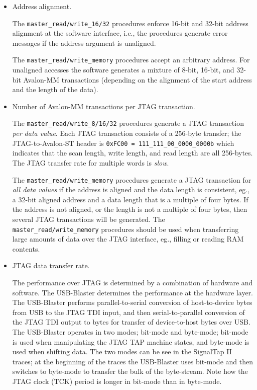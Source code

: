 \documentclass[10pt,twoside]{article}
\begin{document}
\begin{itemize}
\item Address alignment.

The \verb+master_read/write_16/32+ procedures enforce 16-bit and
32-bit address alignment at the software interface, i.e., the 
procedures generate error messages if the address argument is
unaligned.

The \verb+master_read/write_memory+ procedures accept an arbitrary
address. For unaligned accesses the software generates a mixture
of 8-bit, 16-bit, and 32-bit Avalon-MM transactions (depending on
the alignment of the start address and the length of the data).

\item Number of Avalon-MM transactions per JTAG transaction.

The \verb+master_read/write_8/16/32+ procedures generate a
JTAG transaction {\em per data value}. Each JTAG
transaction consists of a 256-byte transfer;
the JTAG-to-Avalon-ST header is \verb+0xFC00 = 111_111_00_0000_0000b+
which indicates that the scan length, write length, and read length
are all 256-bytes. The JTAG transfer rate for multiple words is 
{\em slow}.

The \verb+master_read/write_memory+ procedures generate a
JTAG transaction for {\em all data values} if the address
is aligned and the data length is consistent, eg., a 32-bit
aligned address and a data length that is a multiple of
four bytes. If the address is not aligned, or the length is
not a multiple of four bytes, then several JTAG transactions
will be generated. The \verb+master_read/write_memory+
procedures should be used when transferring
large amounts of data over the JTAG interface, eg., filling
or reading RAM contents.

\item JTAG data transfer rate.

The performance over JTAG is determined by a combination of hardware 
and software. The USB-Blaster determines the performance at the
hardware layer. The USB-Blaster performs parallel-to-serial
conversion of host-to-device bytes from USB to the JTAG TDI input,
and then serial-to-parallel conversion of the JTAG TDI output
to bytes for transfer of device-to-host bytes over USB.
The USB-Blaster operates in two modes; bit-mode and byte-mode;
bit-mode is used when manipulating the JTAG TAP machine states,
and byte-mode is used when shifting data. The two modes can
be see in the SignalTap II traces; at the beginning of the
traces the USB-Blaster uses bit-mode and then switches to
byte-mode to transfer the bulk of the byte-stream. Note how
the JTAG clock (TCK) period is longer in bit-mode than in byte-mode.


\end{itemize}
\end{document}
